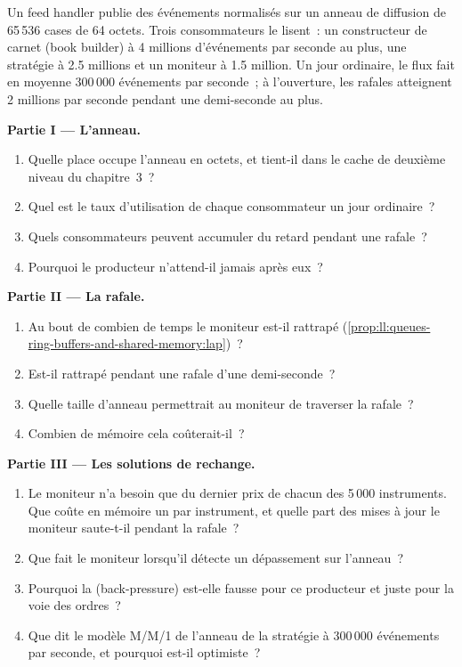 \begin{problem}\label{pb:ll:queues-ring-buffers-and-shared-memory:1}
Un feed handler publie des événements normalisés sur un anneau de diffusion de 65\,536 cases de 64 octets. Trois consommateurs le lisent~: un constructeur de carnet
(book builder) à 4 millions d'événements par seconde au plus, une stratégie à 2.5 millions et un moniteur à 1.5 million. Un jour ordinaire, le flux
fait en moyenne 300\,000 événements par seconde~; à l'ouverture, les rafales atteignent 2 millions par seconde pendant une demi-seconde au plus.

\medskip\noindent\textbf{Partie I --- L'anneau.}
\begin{enumerate}
\item Quelle place occupe l'anneau en octets, et tient-il dans le cache de deuxième niveau du chapitre~3~?
\item Quel est le taux d'utilisation de chaque consommateur un jour ordinaire~?
\item Quels consommateurs peuvent accumuler du retard pendant une rafale~?
\item Pourquoi le producteur n'attend-il jamais après eux~?
\end{enumerate}

\medskip\noindent\textbf{Partie II --- La rafale.}
\begin{enumerate}[resume]
\item Au bout de combien de temps le moniteur est-il rattrapé (\cref{prop:ll:queues-ring-buffers-and-shared-memory:lap})~?
\item Est-il rattrapé pendant une rafale d'une demi-seconde~?
\item Quelle taille d'anneau permettrait au moniteur de traverser la rafale~?
\item Combien de mémoire cela coûterait-il~?
\end{enumerate}

\medskip\noindent\textbf{Partie III --- Les solutions de rechange.}
\begin{enumerate}[resume]
\item Le moniteur n'a besoin que du dernier prix de chacun des 5\,000 instruments. Que coûte en mémoire un  par instrument,
et quelle part des mises à jour le moniteur saute-t-il pendant la rafale~?
\item Que fait le moniteur lorsqu'il détecte un dépassement sur l'anneau~?
\item Pourquoi la  (back-pressure) est-elle fausse pour ce producteur et juste pour la voie des ordres~?
\item Que dit le modèle M/M/1 de l'anneau de la stratégie à 300\,000 événements par seconde, et pourquoi est-il optimiste~?
\end{enumerate}


\end{problem}
